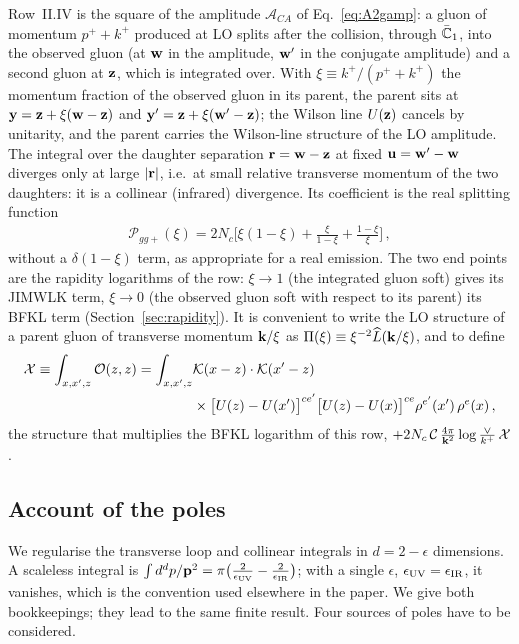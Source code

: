 Row~II.IV is the square of the amplitude $\mathcal A_{CA}$ of Eq.~\eqref{eq:A2gamp}: a gluon of momentum $p^++k^+$ produced at LO splits after the collision, through $\bar{\mathbb{C}}_1$, into the observed gluon (at $\mathbf{w}$ in the amplitude, $\mathbf{w}'$ in the conjugate amplitude) and a second gluon at $\mathbf{z}$, which is integrated over. With $\xi\equiv k^+/(p^++k^+)$ the momentum fraction of the observed gluon in its parent, the parent sits at $\mathbf{y}=\mathbf{z}+\xi(\mathbf{w}-\mathbf{z})$ and $\mathbf{y}'=\mathbf{z}+\xi(\mathbf{w}'-\mathbf{z})$; the Wilson line $U(\mathbf{z})$ cancels by unitarity, and the parent carries the Wilson-line structure of the LO amplitude. The integral over the daughter separation $\mathbf{r}=\mathbf{w}-\mathbf{z}$ at fixed $\mathbf{u}=\mathbf{w}'-\mathbf{w}$ diverges only at large $|\mathbf{r}|$, i.e.\ at small relative transverse momentum of the two daughters: it is a collinear (infrared) divergence. Its coefficient is the real splitting function
\begin{align}\label{eq:Pggplus}
\mathcal P_{gg+}(\xi)=2N_c\Big[\xi(1-\xi)+\frac{\xi}{1-\xi}+\frac{1-\xi}{\xi}\Big]\,,
\end{align}
without a $\delta(1-\xi)$ term, as appropriate for a real emission. The two end points are the rapidity logarithms of the row: $\xi\to1$ (the integrated gluon soft) gives its JIMWLK term, $\xi\to0$ (the observed gluon soft with respect to its parent) its BFKL term (Section~\ref{sec:rapidity}). It is convenient to write the LO structure of a parent gluon of transverse momentum $\mathbf{k}/\xi$ as $\Pi(\xi)\equiv\xi^{-2}\widehat L(\mathbf{k}/\xi)$, and to define
\begin{align}\label{eq:dg_X}
\mathcal X\equiv\int_{x,x',z}\mathcal O(z,z)=\int_{x,x',z}&\mathcal{K}(x-z)\cdot\mathcal{K}(x'-z)\notag\\&\times\big[U(z)-U(x')\big]^{ce'}\big[U(z)-U(x)\big]^{ce}\rho^{e'}(x')\,\rho^e(x)\,,
\end{align}
the structure that multiplies the BFKL logarithm of this row, $+2N_c\,\mathcal C\,\frac{4\pi}{\mathbf{k}^2}\log\frac{\vee}{k^+}\,\mathcal X$.

\subsection{Account of the poles}\label{sec:dg_poles}

We regularise the transverse loop and collinear integrals in $d=2-\epsilon$ dimensions. A scaleless integral is $\int d^dp/\mathbf{p}^2=\pi\big(\frac{2}{\epsilon_{\rm UV}}-\frac{2}{\epsilon_{\rm IR}}\big)$; with a single $\epsilon$, $\epsilon_{\rm UV}=\epsilon_{\rm IR}$, it vanishes, which is the convention used elsewhere in the paper. We give both bookkeepings; they lead to the same finite result. Four sources of poles have to be considered.

